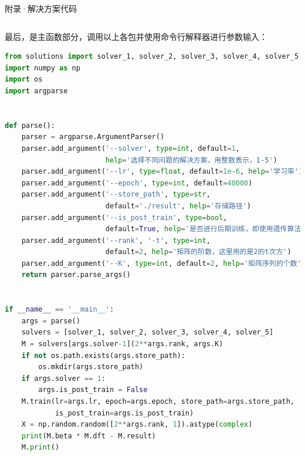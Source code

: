 \documentclass[11pt]{article}
\begin{document}
\begin{section}{附录·解决方案代码}
\begin{lstlisting}[language=Python]
 \end{lstlisting}
 最后，是主函数部分，调用以上各包并使用命令行解释器进行参数输入：
 \begin{lstlisting}[language=Python]
  from solutions import solver_1, solver_2, solver_3, solver_4, solver_5
import numpy as np
import os
import argparse


def parse():
    parser = argparse.ArgumentParser()
    parser.add_argument('--solver', type=int, default=1,
                        help='选择不同问题的解决方案，用整数表示，1-5')
    parser.add_argument('--lr', type=float, default=1e-6, help='学习率')
    parser.add_argument('--epoch', type=int, default=40000)
    parser.add_argument('--store_path', type=str,
                        default='./result', help='存储路径')
    parser.add_argument('--is_post_train', type=bool,
                        default=True, help='是否进行后期训练，即使用遗传算法进一步逼近')
    parser.add_argument('--rank', '-t', type=int,
                        default=2, help='矩阵的阶数，这里用的是2的t次方')
    parser.add_argument('--K', type=int, default=2, help='矩阵序列的个数')
    return parser.parse_args()


if __name__ == '__main__':
    args = parse()
    solvers = [solver_1, solver_2, solver_3, solver_4, solver_5]
    M = solvers[args.solver-1](2**args.rank, args.K)
    if not os.path.exists(args.store_path):
        os.mkdir(args.store_path)
    if args.solver == 1:
        args.is_post_train = False
    M.train(lr=args.lr, epoch=args.epoch, store_path=args.store_path,
            is_post_train=args.is_post_train)
    X = np.random.random([2**args.rank, 1]).astype(complex)
    print(M.beta * M.dft - M.result)
    M.print()

 \end{lstlisting}
\end{section}
\end{document}
